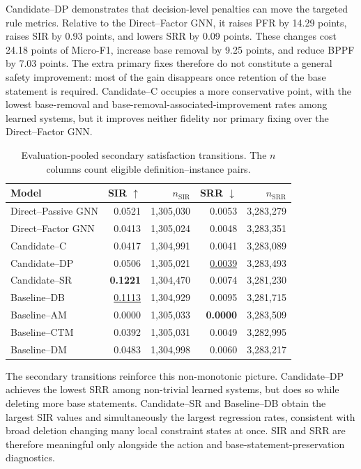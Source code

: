 \documentclass[a4paper,UKenglish,cleveref,autoref,thm-restate]{tgdk-v2021}
\begin{document}
Candidate--DP demonstrates that decision-level penalties can move the targeted rule metrics. Relative to the Direct--Factor GNN, it raises PFR by 14.29 points, raises SIR by 0.93 points, and lowers SRR by 0.09 points. These changes cost 24.18 points of Micro-F1, increase base removal by 9.25 points, and reduce BPPF by 7.03 points. The extra primary fixes therefore do not constitute a general safety improvement: most of the gain disappears once retention of the base statement is required. Candidate--C occupies a more conservative point, with the lowest base-removal and base-removal-associated-improvement rates among learned systems, but it improves neither fidelity nor primary fixing over the Direct--Factor GNN.

\begin{table}[h]
\caption{Evaluation-pooled secondary satisfaction transitions. The \(n\) columns count eligible definition--instance pairs.}
\label{tab:transition-results}
\centering
\small
\begin{tabular}{lrrrr}
\toprule
\textbf{Model} & \textbf{SIR \(\uparrow\)} & \(n_{\mathrm{SIR}}\) & \textbf{SRR \(\downarrow\)} & \(n_{\mathrm{SRR}}\) \\
\midrule
Direct--Passive GNN & 0.0521 & 1,305,030 & 0.0053 & 3,283,279 \\
Direct--Factor GNN  & 0.0413 & 1,305,024 & 0.0048 & 3,283,351 \\
\midrule
Candidate--C  & 0.0417 & 1,304,991 & 0.0041 & 3,283,089 \\
Candidate--DP & 0.0506 & 1,305,021 & \underline{0.0039} & 3,283,493 \\
Candidate--SR & \textbf{0.1221} & 1,304,470 & 0.0074 & 3,281,230 \\
\midrule
Baseline--DB & \underline{0.1113} & 1,304,929 & 0.0095 & 3,281,715 \\
Baseline--AM & 0.0000 & 1,305,033 & \textbf{0.0000} & 3,283,509 \\
Baseline--CTM & 0.0392 & 1,305,031 & 0.0049 & 3,282,995 \\
Baseline--DM & 0.0483 & 1,304,998 & 0.0060 & 3,283,217 \\
\bottomrule
\end{tabular}
\end{table}


The secondary transitions reinforce this non-monotonic picture. Candidate--DP achieves the lowest SRR among non-trivial learned systems, but does so while deleting more base statements. Candidate--SR and Baseline--DB obtain the largest SIR values and simultaneously the largest regression rates, consistent with broad deletion changing many local constraint states at once. SIR and SRR are therefore meaningful only alongside the action and base-statement-preservation diagnostics.
\end{document}

